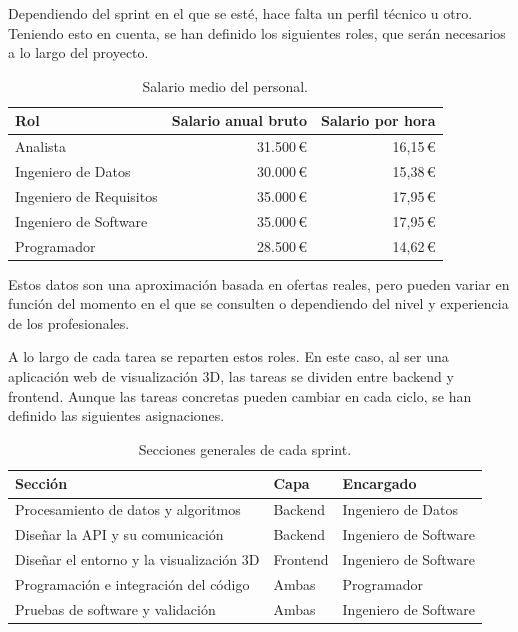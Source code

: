Dependiendo del sprint en el que se esté, hace falta un perfil técnico u otro. Teniendo esto
en cuenta, se han definido los siguientes roles, que serán necesarios a lo largo del proyecto.

\begin{table}[H]
	\centering
	\caption{Salario medio del personal.}
	\begin{tabularx}{0.75\textwidth}{X r r}
		\toprule
		\textbf{Rol} & \textbf{Salario anual bruto} & \textbf{Salario por hora} \\
		\midrule
		Analista                  & 31.500\,\euro{} & 16,15\,\euro{} \\
		Ingeniero de Datos        & 30.000\,\euro{} & 15,38\,\euro{} \\
		Ingeniero de Requisitos   & 35.000\,\euro{} & 17,95\,\euro{} \\
		Ingeniero de Software     & 35.000\,\euro{} & 17,95\,\euro{} \\
		Programador               & 28.500\,\euro{} & 14,62\,\euro{} \\
		\bottomrule
	\end{tabularx}
\end{table}

Estos datos son una aproximación basada en ofertas reales, pero pueden variar en función
del momento en el que se consulten o dependiendo del nivel y experiencia de los
profesionales.

A lo largo de cada tarea se reparten estos roles. En este caso, al ser una aplicación web de
visualización 3D, las tareas se dividen entre backend y frontend. Aunque las tareas
concretas pueden cambiar en cada ciclo, se han definido las siguientes asignaciones.

\begin{table}[H]
	\centering
	\caption{Secciones generales de cada sprint.}
	\begin{tabularx}{\textwidth}{X >{\centering\arraybackslash}p{1.8cm} l}
		\toprule
		\textbf{Sección} & \textbf{Capa} & \textbf{Encargado} \\
		\midrule
		Procesamiento de datos y algoritmos        & Backend  & Ingeniero de Datos \\
		Diseñar la API y su comunicación           & Backend  & Ingeniero de Software \\
		Diseñar el entorno y la visualización 3D   & Frontend & Ingeniero de Software \\
		Programación e integración del código      & Ambas    & Programador \\
		Pruebas de software y validación           & Ambas    & Ingeniero de Software \\
		\bottomrule
	\end{tabularx}
\end{table}

